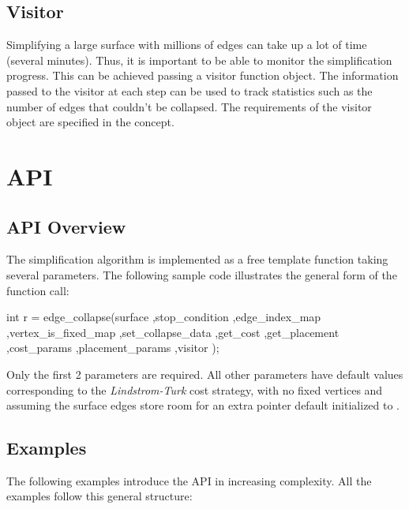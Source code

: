 \subsection{Visitor}

Simplifying a large surface with millions of edges can take up a lot of time (several minutes). Thus, it is important to be able to monitor the simplification progress. This can be achieved passing a visitor function object. The information passed to the visitor at each step can be used to track statistics such as the number of edges that couldn't be collapsed. The requirements of the visitor object are specified in the  concept.

\section{API}

\subsection{API Overview}

The simplification algorithm is implemented as a free template function taking several parameters. The following sample code illustrates the general form of the function call:

\begin{cprog}
int r = edge_collapse(surface
                     ,stop_condition
                     ,edge_index_map
                     ,vertex_is_fixed_map
                     ,set_collapse_data
                     ,get_cost
                     ,get_placement
                     ,cost_params
                     ,placement_params
                     ,visitor 
                     );
\end{cprog}

Only the first 2 parameters are required. All other parameters have default values corresponding to the {\em Lindstrom-Turk} cost strategy, with no fixed vertices and assuming the surface edges store room for an extra pointer default initialized to .

\subsection{Examples}

The following examples introduce the API in increasing complexity. All the examples follow this general structure:

